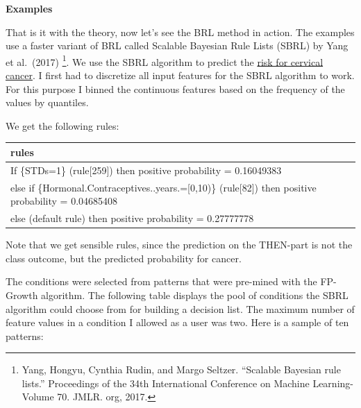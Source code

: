 \documentclass[
  10pt,
]{scrbook}
\begin{document}
\textbf{Examples}

That is it with the theory, now let's see the BRL method in action.
The examples use a faster variant of BRL called Scalable Bayesian Rule Lists (SBRL) by Yang et al.~(2017) \footnote{Yang, Hongyu, Cynthia Rudin, and Margo Seltzer. ``Scalable Bayesian rule lists.'' Proceedings of the 34th International Conference on Machine Learning-Volume 70. JMLR. org, 2017.}.
We use the SBRL algorithm to predict the \protect\hyperlink{cervical}{risk for cervical cancer}.
I first had to discretize all input features for the SBRL algorithm to work.
For this purpose I binned the continuous features based on the frequency of the values by quantiles.

We get the following rules:

\begin{table}
\centering
\begin{tabular}{>{\raggedright\arraybackslash}p{10cm}}
\toprule
rules\\
\midrule
If      \{STDs=1\} (rule[259]) then positive probability = 0.16049383\\
else if \{Hormonal.Contraceptives..years.=[0,10)\} (rule[82]) then positive probability = 0.04685408\\
else  (default rule)  then positive probability = 0.27777778\\
\bottomrule
\end{tabular}
\end{table}

Note that we get sensible rules, since the prediction on the THEN-part is not the class outcome, but the predicted probability for cancer.

The conditions were selected from patterns that were pre-mined with the FP-Growth algorithm.
The following table displays the pool of conditions the SBRL algorithm could choose from for building a decision list.
The maximum number of feature values in a condition I allowed as a user was two.
Here is a sample of ten patterns:
\end{document}
